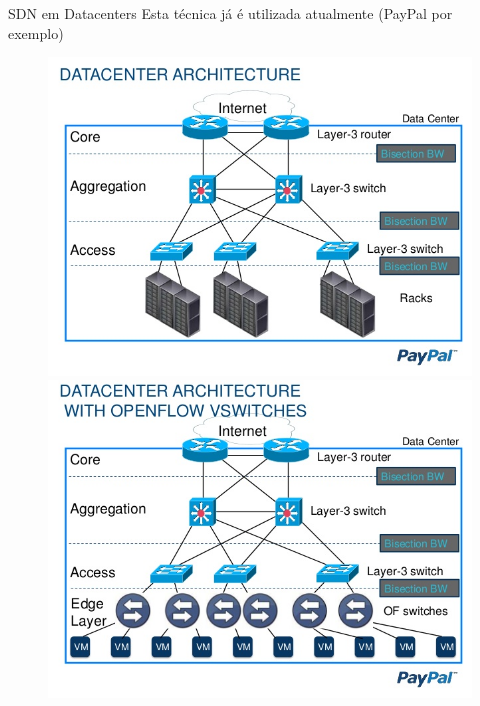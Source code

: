 \documentclass[aspectratio=169]{beamer}
\begin{document}
	\begin{frame} {SDN em Datacenters}
		Esta técnica já é utilizada atualmente (PayPal por exemplo)
		\begin{figure}[ht]   
			\includegraphics[scale=0.3]{imagens/sdn-1.jpg}
			\includegraphics[scale=0.3]{imagens/sdn-2.jpg}
			\label{fig:sample_figure}
		\end{figure}
	\end{frame}
\end{document}
